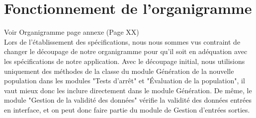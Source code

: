 \documentclass[a4paper,11pt]{article}
\begin{document}
	\section{Fonctionnement de l'organigramme}
		Voir Organigramme page annexe (Page XX)\\

		Lors de l'établissement des spécifications, nous nous sommes vus contraint de changer le découpage de notre organigramme pour qu’il soit en adéquation avec les spécifications de notre application. 
		Avec le découpage initial, nous utilisions uniquement des méthodes de la classe du module Génération de la nouvelle population dans les modules "Tests d’arrêt" et "Évaluation de la population", il vaut mieux donc les inclure directement dans le module Génération.
		De même, le module "Gestion de la validité des données" vérifie la validité des données entrées en interface, et on peut donc faire partie du module de Gestion d'entrées sorties.\\

		
		
\end{document}
